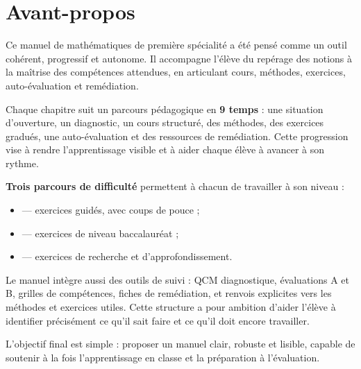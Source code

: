 
\chapter*{Avant-propos}

Ce manuel de mathématiques de première spécialité a été pensé comme un outil
cohérent, progressif et autonome. Il accompagne l'élève du repérage des
notions à la maîtrise des compétences attendues, en articulant cours,
méthodes, exercices, auto-évaluation et remédiation.

Chaque chapitre suit un parcours pédagogique en \textbf{9 temps} : une
situation d'ouverture, un diagnostic, un cours structuré, des méthodes,
des exercices gradués, une auto-évaluation et des ressources de remédiation.
Cette progression vise à rendre l'apprentissage visible et à aider chaque élève
à avancer à son rythme.

\medskip

\textbf{Trois parcours de difficulté} permettent à chacun de travailler à son
niveau :
\begin{itemize}
  \item \textbf{} — exercices guidés, avec coups de pouce ;
  \item \textbf{} — exercices de niveau baccalauréat ;
  \item \textbf{} — exercices de recherche et d'approfondissement.
\end{itemize}

Le manuel intègre aussi des outils de suivi : QCM diagnostique, évaluations A
et B, grilles de compétences, fiches de remédiation, et renvois explicites vers
les méthodes et exercices utiles. Cette structure a pour ambition d'aider
l'élève à identifier précisément ce qu'il sait faire et ce qu'il doit encore
travailler.

\medskip

L'objectif final est simple : proposer un manuel clair, robuste et lisible,
capable de soutenir à la fois l'apprentissage en classe et la préparation à
l'évaluation.


\newpage
